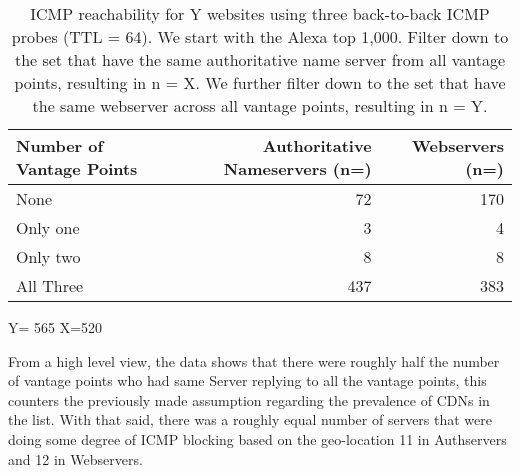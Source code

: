 \begin{table*}
\small

    \begin{center}

    \begin{tabular}{|l|r|r|} \hline
        Number of Vantage Points &
        Authoritative Nameservers 
        (n=) &
        Webservers
        (n=)

        \\ \hline

        None    & 72 & 170 \\ \hline
        Only one & 3 & 4 \\ \hline
        Only two & 8 & 8 \\ \hline
        All Three & 437 & 383 \\ \hline
       
       
    \end{tabular}

    \caption{ICMP reachability for Y websites using three back-to-back ICMP
        probes (TTL = 64). We start with the
        Alexa top 1,000.  Filter down to the set that have the same
        authoritative name server from all vantage points, resulting in n =  X.
        We further filter down to the set that have the same webserver across
    all vantage points, resulting in n = Y.}
    \label{tab:ICMPreachabilityacrossvantages}

    \end{center}
    Y= 565
    X=520
    
\end{table*}

From a high level view, the data shows that there were roughly half the number of vantage points who had same Server replying to all the vantage points, this counters the previously made assumption regarding the prevalence of CDNs in the list. With that said, there was a roughly equal number of servers that were doing some degree of ICMP blocking based on the geo-location 11 in Authservers and 12 in Webservers.